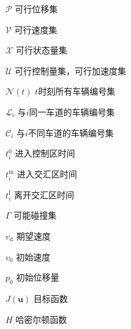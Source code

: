 \begin{denotation}[3cm]
\item[$\mathcal{P}$] 可行位移集
\item[$\mathcal{V}$] 可行速度集
\item[$\mathcal{X}$] 可行状态量集
\item[$\mathcal{U}$] 可行控制量集，可行加速度集
\item[$\mathcal{N}(t)$] $t$时刻所有车辆编号集
\item[$\mathcal{L}_i$] 与$i$同一车道的车辆编号集
\item[$\mathcal{C}_i$] 与$i$不同车道的车辆编号集
\item[$t_i^0$] 进入控制区时间
\item[$t_i^\mathrm{m}$] 进入交汇区时间
\item[$t_i^\mathrm{f}$] 离开交汇区时间
\item[$\Gamma$] 可能碰撞集
\item[$v_\mathrm{d}$] 期望速度
\item[$v_0$] 初始速度
\item[$p_0$] 初始位移量
\item[$J(\bm{u})$] 目标函数
\item[$H$] 哈密尔顿函数
\end{denotation}

